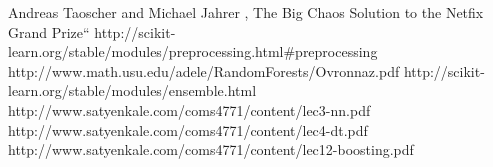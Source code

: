 \documentclass[conference]{IEEEtran}
\begin{document}

%
%
%
\begin{thebibliography}{1}

Andreas Taoscher and Michael Jahrer , The Big Chaos Solution to the Netfix Grand Prize“ 
http://scikit-learn.org/stable/modules/preprocessing.html\#preprocessing
http://www.math.usu.edu/adele/RandomForests/Ovronnaz.pdf
http://scikit-learn.org/stable/modules/ensemble.html
http://www.satyenkale.com/coms4771/content/lec3-nn.pdf
http://www.satyenkale.com/coms4771/content/lec4-dt.pdf
http://www.satyenkale.com/coms4771/content/lec12-boosting.pdf
\end{thebibliography}



\end{document}
